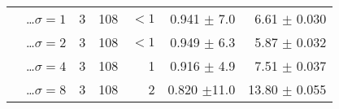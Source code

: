 \begin{tabularx}{\linewidth}{p{3.1cm} p{3cm} r r r r r}
        & \hspace{2mm} \ldots ${\sigma = 1}$
                                    & 3 & 108   &${<}1$ & 0.941 $\pm$ 7.0   & 6.61 $\pm$ 0.030 \\
        & \hspace{2mm} \ldots ${\sigma = 2}$
                                    & 3 & 108   &${<}1$ & 0.949 $\pm$ 6.3   & 5.87 $\pm$ 0.032 \\
        & \hspace{2mm} \ldots ${\sigma = 4}$
                                    & 3 & 108   &  1    & 0.916 $\pm$ 4.9   & 7.51 $\pm$ 0.037 \\
        & \hspace{2mm} \ldots ${\sigma = 8}$
                                    & 3 & 108   &  2    & 0.820 $\pm$11.0   &13.80 $\pm$ 0.055 \\



\end{tabularx}
